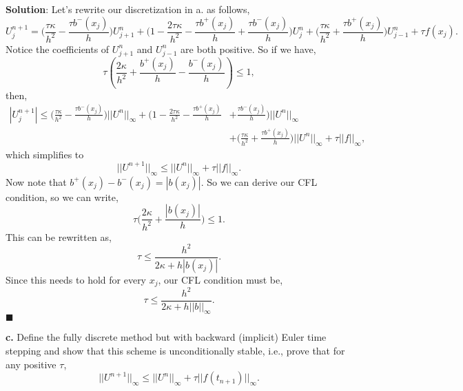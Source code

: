 \documentclass[11pt]{article}
\begin{document}
\textbf{Solution}: Let's rewrite our discretization in a. as follows,
\begin{equation*}
    U^{n+1}_j = \big( \frac{\tau \kappa}{h^2} - \frac{\tau b^-(x_j)}{h} \big) U^n_{j+1} + \big( 1 - \frac{2\tau \kappa}{h^2} - \frac{\tau b^+(x_j)}{h} + \frac{\tau b^-(x_j)}{h} \big) U^n_j + \big( \frac{\tau \kappa}{h^2} + \frac{\tau b^+(x_j)}{h} \big) U^n_{j-1} + \tau f(x_j).
\end{equation*}
Notice the coefficients of $U^n_{j+1}$ and $U^n_{j-1}$ are both positive. 
So if we have,
\begin{equation*}
    \tau (\frac{2\kappa}{h^2} + \frac{b^+(x_j)}{h} - \frac{b^-(x_j)}{h} ) \leq 1,
\end{equation*}
then,
\begin{equation*}
\begin{split}
    |U^{n+1}_j| \leq \big( \frac{\tau \kappa}{h^2} - \frac{\tau b^-(x_j)}{h} \big) ||U^n||_{\infty} + \big( 1 - \frac{2\tau \kappa}{h^2} - \frac{\tau b^+(x_j)}{h} &+ \frac{\tau b^-(x_j)}{h} \big) ||U^n||_{\infty} \\
    &+ \big( \frac{\tau \kappa}{h^2} + \frac{\tau b^+(x_j)}{h} \big) ||U^n||_{\infty} +\tau ||f||_\infty,
\end{split}
\end{equation*}
which simplifies to 
\begin{equation*}
    ||U^{n+1}||_\infty \leq ||U^n||_\infty + \tau ||f||_\infty.
\end{equation*}
Now note that $b^+(x_j) - b^-(x_j) = |b(x_j)|$.
So we can derive our CFL condition, so we can write,
\begin{equation*}
    \tau \big( \frac{2\kappa}{h^2} + \frac{|b(x_j)|}{h} \big) \leq 1.
\end{equation*}
This can be rewritten as,
\begin{equation*}
    \tau \leq \frac{h^2}{2\kappa + h|b(x_j)|}.
\end{equation*}
Since this needs to hold for every $x_j$, our CFL condition must be,
\begin{equation*}
    \tau \leq \frac{h^2}{2\kappa + h||b||_\infty}.
\end{equation*}
$\blacksquare$


\vskip 2cm


\textbf{c.} Define the fully discrete method but with backward (implicit) Euler time stepping and show that this scheme is unconditionally stable, i.e., prove that for any positive $\tau$,
\begin{equation}
    ||U^{n+1}||_\infty \leq ||U^n||_\infty + \tau ||f(t_{n+1})||_\infty.
\end{equation}
\end{document}

